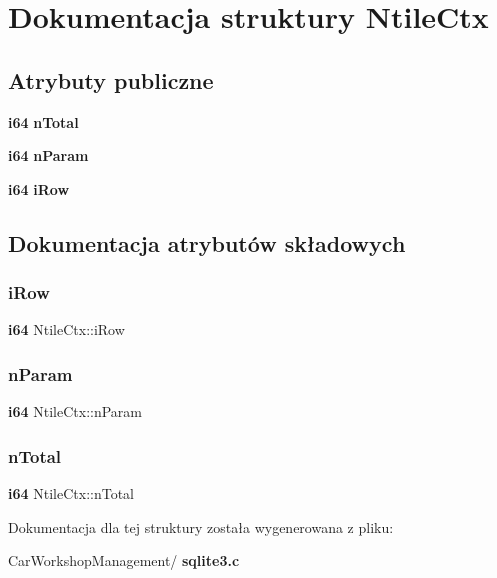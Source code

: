 \section{Dokumentacja struktury Ntile\+Ctx}
\label{struct_ntile_ctx}
\subsection*{Atrybuty publiczne}
\begin{DoxyCompactItemize}
\item 
\textbf{ i64} \textbf{ n\+Total}
\item 
\textbf{ i64} \textbf{ n\+Param}
\item 
\textbf{ i64} \textbf{ i\+Row}
\end{DoxyCompactItemize}


\subsection{Dokumentacja atrybutów składowych}
\mbox{\label{struct_ntile_ctx_aab561fe68bb779ef2b318186cb02edf6}} 
\subsubsection{iRow}
{\footnotesize\ttfamily \textbf{ i64} Ntile\+Ctx\+::i\+Row}

\mbox{\label{struct_ntile_ctx_a42c2a429bdd0430848db2e1be7b2e379}} 
\subsubsection{nParam}
{\footnotesize\ttfamily \textbf{ i64} Ntile\+Ctx\+::n\+Param}

\mbox{\label{struct_ntile_ctx_aa596b7c8532c9df9e4102a3a0181a911}} 
\subsubsection{nTotal}
{\footnotesize\ttfamily \textbf{ i64} Ntile\+Ctx\+::n\+Total}



Dokumentacja dla tej struktury została wygenerowana z pliku\+:\begin{DoxyCompactItemize}
\item 
Car\+Workshop\+Management/\textbf{ sqlite3.\+c}\end{DoxyCompactItemize}
